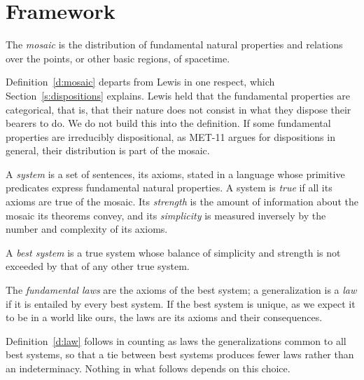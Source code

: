 \documentclass{situationist-preprint}
\begin{document}
\section{Framework}\label{s:framework}

\begin{definition}[Mosaic]\label{d:mosaic}
The \emph{mosaic} is the distribution of fundamental natural properties and relations over the points, or other basic regions, of spacetime.
\end{definition}

Definition~\ref{d:mosaic} departs from Lewis in one respect, which Section~\ref{s:dispositions} explains. Lewis held that the fundamental properties are categorical, that is, that their nature does not consist in what they dispose their bearers to do. We do not build this into the definition. If some fundamental properties are irreducibly dispositional, as MET-11 argues for dispositions in general, their distribution is part of the mosaic.

\begin{definition}[Systems]\label{d:system}
A \emph{system} is a set of sentences, its axioms, stated in a language whose primitive predicates express fundamental natural properties. A system is \emph{true} if all its axioms are true of the mosaic. Its \emph{strength} is the amount of information about the mosaic its theorems convey, and its \emph{simplicity} is measured inversely by the number and complexity of its axioms.
\end{definition}

\begin{definition}\label{d:best}
A \emph{best system} is a true system whose balance of simplicity and strength is not exceeded by that of any other true system.
\end{definition}

\begin{definition}[Law]\label{d:law}
The \emph{fundamental laws} are the axioms of the best system; a generalization is a \emph{law} if it is entailed by every best system. If the best system is unique, as we expect it to be in a world like ours, the laws are its axioms and their consequences.
\end{definition}

Definition~\ref{d:law} follows \citet[ch.~3]{Lewis1973Counterfactuals} in counting as laws the generalizations common to all best systems, so that a tie between best systems produces fewer laws rather than an indeterminacy. Nothing in what follows depends on this choice.
\end{document}
